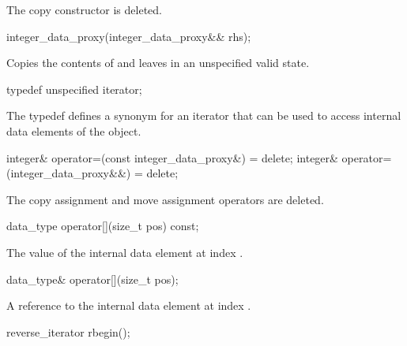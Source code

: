 \begin{itemdescr}
The copy constructor is deleted.		
\end{itemdescr}

\begin{itemdecl}
integer_data_proxy(integer_data_proxy&& rhs);		
\end{itemdecl}

\begin{itemdescr}
\effects Copies the contents of  and leaves  in an unspecified valid state.		
\end{itemdescr}

\begin{itemdecl}
typedef unspecified iterator;		
\end{itemdecl}

\begin{itemdescr}
The typedef defines a synonym for an iterator that can be used to access internal data elements of the  object.		
\end{itemdescr}

\begin{itemdecl}
integer& operator=(const integer_data_proxy&) = delete;
integer& operator=(integer_data_proxy&&) = delete;		
\end{itemdecl}

\begin{itemdescr}
The copy assignment and move assignment operators are deleted.		
\end{itemdescr}

\begin{itemdecl}
data_type operator[](size_t pos) const;		
\end{itemdecl}

\begin{itemdescr}
\returns The value of the internal data element at index .		
\end{itemdescr}

\begin{itemdecl}
data_type& operator[](size_t pos);		
\end{itemdecl}

\begin{itemdescr}
\returns A reference to the internal data element at index .		
\end{itemdescr}

\begin{itemdecl}
reverse_iterator rbegin();		
\end{itemdecl}

